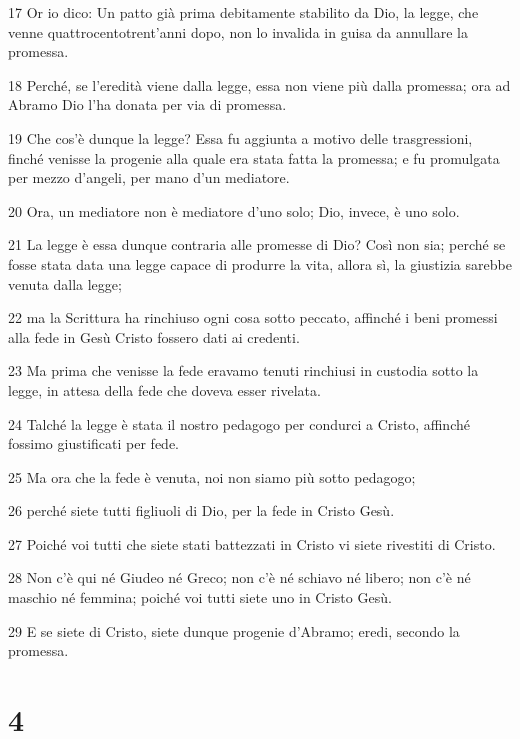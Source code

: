 \par 17 Or io dico: Un patto già prima debitamente stabilito da Dio, la legge, che venne quattrocentotrent'anni dopo, non lo invalida in guisa da annullare la promessa.
\par 18 Perché, se l'eredità viene dalla legge, essa non viene più dalla promessa; ora ad Abramo Dio l'ha donata per via di promessa.
\par 19 Che cos'è dunque la legge? Essa fu aggiunta a motivo delle trasgressioni, finché venisse la progenie alla quale era stata fatta la promessa; e fu promulgata per mezzo d'angeli, per mano d'un mediatore.
\par 20 Ora, un mediatore non è mediatore d'uno solo; Dio, invece, è uno solo.
\par 21 La legge è essa dunque contraria alle promesse di Dio? Così non sia; perché se fosse stata data una legge capace di produrre la vita, allora sì, la giustizia sarebbe venuta dalla legge;
\par 22 ma la Scrittura ha rinchiuso ogni cosa sotto peccato, affinché i beni promessi alla fede in Gesù Cristo fossero dati ai credenti.
\par 23 Ma prima che venisse la fede eravamo tenuti rinchiusi in custodia sotto la legge, in attesa della fede che doveva esser rivelata.
\par 24 Talché la legge è stata il nostro pedagogo per condurci a Cristo, affinché fossimo giustificati per fede.
\par 25 Ma ora che la fede è venuta, noi non siamo più sotto pedagogo;
\par 26 perché siete tutti figliuoli di Dio, per la fede in Cristo Gesù.
\par 27 Poiché voi tutti che siete stati battezzati in Cristo vi siete rivestiti di Cristo.
\par 28 Non c'è qui né Giudeo né Greco; non c'è né schiavo né libero; non c'è né maschio né femmina; poiché voi tutti siete uno in Cristo Gesù.
\par 29 E se siete di Cristo, siete dunque progenie d'Abramo; eredi, secondo la promessa.

\chapter{4}

